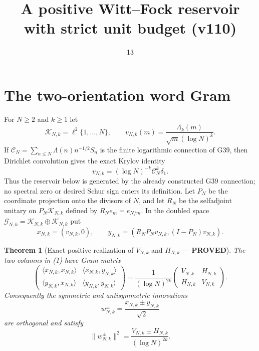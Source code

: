 \documentclass[11pt]{article}
\title{A positive Witt--Fock reservoir with strict unit budget (v110)}
\date{13}
\newcommand{\PROVED}{\textcolor{green!40!black}{\textbf{PROVED}}}
\newtheorem{theorem}{Theorem}
\begin{document}
\maketitle

\section{The two-orientation word Gram}

For $N\ge2$ and $k\ge1$ let
\[
 \mathscr K_{N,k}=\ell^2\{1,\ldots,N\},
 \qquad
 v_{N,k}(m)=\frac{\Lambda_k(m)}{\sqrt m(\log N)^k}.
\]
If $\mathcal C_N=\sum_{n\le N}\Lambda(n)n^{-1/2}S_n$ is the finite
logarithmic connection of G39, then Dirichlet convolution gives the exact
Krylov identity
\begin{equation}
                 v_{N,k}=(\log N)^{-k}\mathcal C_N^k\delta_1. \tag{0}
\end{equation}
Thus the reservoir below is generated by the already constructed G39
connection; no spectral zero or desired Schur sign enters its definition.
Let $P_N$ be the coordinate projection onto the divisors of $N$, and let
$R_N$ be the selfadjoint unitary on $P_N\mathscr K_{N,k}$ defined by
$R_Ne_m=e_{N/m}$.  In the doubled space
$\mathscr G_{N,k}=\mathscr K_{N,k}\oplus\mathscr K_{N,k}$ put
\begin{equation}
 x_{N,k}=(v_{N,k},0),
 \qquad
 y_{N,k}=(R_NP_Nv_{N,k},(I-P_N)v_{N,k}).                      \tag{1}
\end{equation}

\begin{theorem}[Exact positive realization of $V_{N,k}$ and $H_{N,k}$ ---
\PROVED]
The two columns in (1) have Gram matrix
\begin{equation}
 \begin{pmatrix}
  \langle x_{N,k},x_{N,k}\rangle&
  \langle x_{N,k},y_{N,k}\rangle\\
  \langle y_{N,k},x_{N,k}\rangle&
  \langle y_{N,k},y_{N,k}\rangle
 \end{pmatrix}
 =\frac1{(\log N)^{2k}}
 \begin{pmatrix}V_{N,k}&H_{N,k}\\H_{N,k}&V_{N,k}\end{pmatrix}. \tag{2}
\end{equation}
Consequently the symmetric and antisymmetric innovations
\begin{equation}
 w_{N,k}^{\pm}=\frac{x_{N,k}\pm y_{N,k}}{\sqrt2}              \tag{3}
\end{equation}
are orthogonal and satisfy
\begin{equation}
 \|w_{N,k}^{\pm}\|^2
 =\frac{V_{N,k}\pm H_{N,k}}{(\log N)^{2k}}.                  \tag{4}
\end{equation}
\end{theorem}
\end{document}
